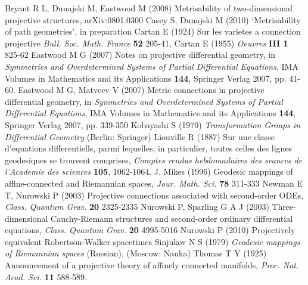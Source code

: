 \documentclass[letterpaper]{amsart}
\theoremstyle{definition}
\theoremstyle{remark}
\begin{document}
\begin{thebibliography}{99}
 Bryant R L, Dunajski M, Eastwood M (2008) 
Metrisability of two-dimensional projective structures, arXiv:0801.0300 
 Casey S, Dunajski M (2010) `Metrisability of path
  geometries', in preparation
 Cartan E (1924) Sur les varietes a connection projective
  \emph{Bull. Soc. Math. France} {\bf 52} 205-41, 
Cartan E (1955) \emph{Oeuvres} {\bf III 1} 825-62
 Eastwood M G (2007) Notes on projective differential
  geometry, in \emph{Symmetries and Overdetermined Systems of Partial 
Differential Equations}, IMA Volumes in Mathematics and its Applications
{\bf 144}, Springer Verlag 2007, pp. 41-60.
 Eastwood M G, Matveev V (2007) Metric connections in
  projective differential geometry, in \emph{Symmetries and Overdetermined Systems of Partial 
Differential Equations}, IMA Volumes in Mathematics and its Applications
{\bf 144}, Springer Verlag 2007, pp. 339-350
 Kobayashi S (1970) \emph{Transformation Groups 
in Differential Geometry} (Berlin: Springer)
 Liouville R (1887) Sur une classe d'equations differentiells, parmi lequelles, in particulier, toutes
celles des lignes geodesiques se trouvent comprises, \emph{Comptes rendus hebdomadaires des seances de
l'Academie des sciences} {\bf 105}, 1062-1064.
 J. Mikes (1996) Geodesic mappings of
  affine-connected and Riemannian spaces, \emph{Jour. Math. Sci.} {\bf
    78} 311-333
 Newman E T, Nurowski P (2003) Projective connections 
associated with second-order ODEs, \emph{Class. Quantum Grav.} {\bf
  20} 2325-2335
 Nurowski P, Sparling G A J (2003) Three-dimensional Cauchy-Riemann structures and
second-order ordinary differential equations, \emph{Class. Quantum
  Grav.} {\bf 20} 4995-5016
 Nurowski P (2010) Projectively equivalent Robertson-Walker spacetimes 
 Sinjukov N S (1979) \emph{Geodesic mappings of
  Riemannian spaces} (Russian), (Moscow: Nauka)
 Thomas T Y (1925) Announcement of a projective theory of 
affinely connected manifolds, \emph{Proc. Nat.
     Acad. Sci.} {\bf 11} 588-589.
\end{thebibliography}
\end{document}

